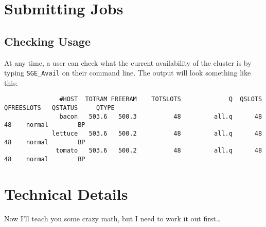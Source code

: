 \documentclass[]{book}
\begin{document}
\chapter{Submitting Jobs}\label{submitting-jobs}

\section{Checking Usage}\label{checking-usage}

At any time, a user can check what the current availability of the
cluster is by typing \texttt{SGE\_Avail} on their command line. The
output will look something like this:

\begin{verbatim}
               #HOST  TOTRAM FREERAM    TOTSLOTS             Q  QSLOTS  QFREESLOTS   QSTATUS     QTYPE
               bacon   503.6   500.3          48         all.q      48          48    normal        BP
             lettuce   503.6   500.2          48         all.q      48          48    normal        BP
              tomato   503.6   500.2          48         all.q      48          48    normal        BP
\end{verbatim}

\chapter{Technical Details}\label{technical-details}

Now I'll teach you some crazy math, but I need to work it out
first\ldots{}


\end{document}

